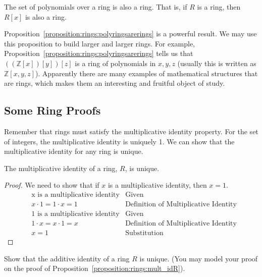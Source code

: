 \begin{prop}\label{proposition:rings:polyringsarerings} The set of polynomials over a ring is also a ring. That is, if $R$ is a ring, then $R[x]$ is also a ring.
\end{prop}

Proposition~\ref{proposition:rings:polyringsarerings} is a powerful result. We may use this proposition to build larger and larger rings. For example, Proposition~\ref{proposition:rings:polyringsarerings} tells us that $((\mathbb{Z}[x])[y])[z]$ is a ring of polynomials in $x,y,z$  (usually this is written as $\mathbb{Z}[x,y,z]$). Apparently there are many examples of mathematical structures that are rings, which makes them an interesting and fruitful object of study.



\subsection{Some Ring Proofs}

Remember that rings must satisfy the multiplicative identity property. For the set of integers, the multiplicative identity is uniquely 1. We can show that the multiplicative identity for any ring is unique.

\begin{prop}\label{proposition:rings:mult_idR}
The multiplicative identity of a ring, $R$, is unique.\\

\begin{proof}
We need to show that if $x$ is a multiplicative identity, then $x=1$.
\begin{align*}
&\text{x is a multiplicative identity} & \text{Given}\\
&x\cdot1=1\cdot x=1 & \text{Definition of Multiplicative Identity}\\
&\text{1 is a multiplicative identity} & \text{Given}\\  
&1\cdot x=x\cdot1=x & \text{Definition of Multiplicative Identity} \\
&x=1 & \text{Substitution}
\end{align*}
\end{proof}
\end{prop}

\begin{exercise}\label{exercise:rings:addIdenUnique}
Show that the additive identity of a ring $R$ is unique.  (You may model your proof on the proof of Proposition~\ref{proposition:rings:mult_idR}).
\end{exercise}

